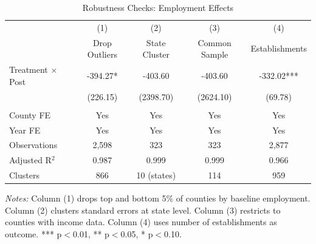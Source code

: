 \documentclass[12pt]{article}
\begin{document}
\begin{table}[H]
\centering
\caption{Robustness Checks: Employment Effects}
\label{tab:robustness}
\begin{tabular}{lcccc}
\toprule
& (1) & (2) & (3) & (4) \\
& Drop Outliers & State Cluster & Common Sample & Establishments \\
\midrule
Treatment $\times$ Post & -394.27* & -403.60 & -403.60 & -332.02*** \\
& (226.15) & (2398.70) & (2624.10) & (69.78) \\
\\
County FE & Yes & Yes & Yes & Yes \\
Year FE & Yes & Yes & Yes & Yes \\
\midrule
Observations & 2,598 & 323 & 323 & 2,877 \\
Adjusted R$^2$ & 0.987 & 0.999 & 0.999 & 0.966 \\
Clusters & 866 & 10 (states) & 114 & 959 \\
\bottomrule
\end{tabular}
\begin{tablenotes}
\small
\item \textit{Notes:} Column (1) drops top and bottom 5\% of counties by baseline employment. Column (2) clusters standard errors at state level. Column (3) restricts to counties with income data. Column (4) uses number of establishments as outcome. *** p$<$0.01, ** p$<$0.05, * p$<$0.10.
\end{tablenotes}
\end{table}
\end{document}
